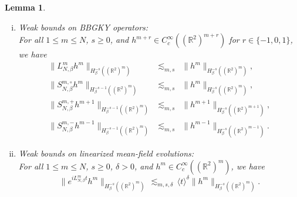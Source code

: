 \documentclass[a4paper,11pt,reqno,noindent]{amsart}
\theoremstyle{plain}
\newtheorem{lem}{Lemma}[section]
\numberwithin{equation}{section}
\newcommand{\R}{\mathbb R}
\newcommand{\3}{|\!|\!|}
\begin{document}
\begin{lem}\label{lem:prelest-LS}\
\begin{enumerate}[(i)]
\item \emph{Weak bounds on BBGKY operators:}\\
For all $1\le m\le N$, $s\ge0$, and $h^{m+r}\in C^\infty_c((\R^2)^{m+r})$ for $r\in\{-1,0,1\}$, we have
\begin{eqnarray*}
\|L^{m}_{N,\beta}h^{m}\|_{H^{-s}_\beta((\R^2)^m)}&\lesssim_{m,s}&\|h^{m}\|_{H^{-s}_\beta((\R^2)^{m})},\\
\|S^{m,\circ}_{N,\beta}h^{m}\|_{H^{-s-1}_\beta((\R^2)^m)}&\lesssim_{m,s}&\|h^{m}\|_{H^{-s}_\beta((\R^2)^{m})},\\
\|S^{m,+}_{N,\beta}h^{m+1}\|_{H^{-s-1}_\beta((\R^2)^m)}&\lesssim_{m,s}&\|h^{m+1}\|_{H^{-s}_\beta((\R^2)^{m+1})},\\
\|S^{m,-}_{N,\beta}h^{m-1}\|_{H^{-s-1}_\beta((\R^2)^m)}&\lesssim_{m,s}&\|h^{m-1}\|_{H^{-s}_\beta((\R^2)^{m-1})}.
\end{eqnarray*}
\item \emph{Weak bounds on linearized mean-field evolutions:}\\
For all $1\le m\le N$, $s\ge0$, $\delta>0$, and $h^m\in C^\infty_c((\R^2)^{m})$, we have
\[\|e^{iL_{N,\beta}^mt}h^m\|_{H^{-s}_\beta((\R^2)^m)}\,\lesssim_{m,s,\delta}\,\langle t\rangle^{\delta}\|h^m\|_{H^{-s}_\beta((\R^2)^m)}.\]
\end{enumerate}
\end{lem}
\end{document}
